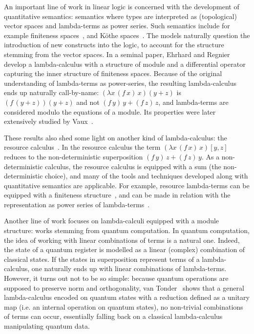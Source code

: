 \documentclass{LMCS}
\begin{document}
An important line of work in linear logic is concerned with the
development of quantitative semantics: semantics where types are
interpreted as (topological) vector spaces and lambda-terms as power
series. Such semantics include for example finiteness
spaces~\cite{EhrhardMSCS05,TassonTLCA09}, and K\"{o}the
spaces~\cite{EhrhardMSCS03}. The models naturally question the
introduction of new constructs into the logic, to account for the
structure stemming from the vector spaces. In a seminal paper, Ehrhard
and Regnier~\cite{EhrhardRegnierTCS03} develop a lambda-calculus with
a structure of module and a differential operator capturing the inner
structure of finiteness spaces. Because of the original understanding
of lambda-terms as power-series, the resulting lambda-calculus ends up
naturally call-by-name: $(\lambda x\,(f\,x)\,x)(y+z)$ is
$(f\,(y+z))(y+z)$ and not $(f\,y)\,y + (f\,z)\,z$, and lambda-terms
are considered modulo the equations of a module. Its properties were later
extensively studied by Vaux~\cite{VauxRTA07,VauxMSCS09}.

These results also shed some light on another kind of
lambda-calculus: the resource calculus~\cite{BoudolINRIA93}. In the
resource calculus 
the term $(\lambda x\,(f\,x)\,x)[y,z]$ reduces to the non-deterministic superposition $(f\,y)\,z+(f\,z)\,y$.
As a non-deterministic calculus, the resource
calculus is equipped with a sum (the non-deterministic choice), and
many of the tools and techniques developed along with quantitative
semantics are applicable. For example, resource lambda-terms can be
equipped with a finiteness structure~\cite{EhrhardLICS10}, and can be
made in relation with the representation as power series of
lambda-terms~\cite{EhrhardLMCS12,BoudesCSL13}.

\smallskip
Another line of work focuses on lambda-calculi equipped with a module
structure: works stemming from quantum computation. In quantum
computation, the idea of working with linear combinations of terms is
a natural one. Indeed, the state of a quantum register is modelled as
a linear (complex) combination of classical states. If the states in
superposition represent terms of a lambda-calculus, one naturally
ends up with linear combinations of lambda-terms. However, it turns
out not to be so simple: because quantum operations are supposed to
preserve norm and orthogonality, van Tonder~\cite{vanTonderSIAM04}
shows that a general lambda-calculus encoded on quantum states with a
reduction defined as a unitary map (i.e. an internal operation on
quantum states), no non-trivial combinations of terms can occur,
essentially falling back on a classical lambda-calculus manipulating
quantum data.
\end{document}
